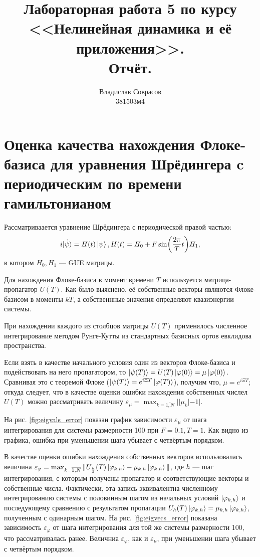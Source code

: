 \documentclass[a4paper]{article}
\begin{document}
\title{Лабораторная работа 5 по курсу <<Нелинейная динамика и её приложения>>. \\Отчёт.}
\author{Владислав Соврасов\\ 381503м4}
\date{}
\maketitle

\section{Оценка качества нахождения Флоке-базиса для уравнения Шрёдингера c
периодическим по времени гамильтонианом}
Рассматриваается уравнение Шрёдингера с периодической правой частью:
\begin{equation}
	\label{eq:schrodinger_eq}
	i \dot{\ket \psi} = H(t)\ket \psi, H(t)=H_0 + F \sin(\frac{2\pi}{T} t)H_1,
\end{equation}
в котором \(H_0, H_1\) --- GUE матрицы.

Для нахождения Флоке-базиса в момент времени \(T\) используется матрица-пропагатор \(U(T)\).
Как было выяснено, её собственные векторы являются Флоке-базисом в моменты \(kT\),
а собственнные значения определяют квазиэнергии системы.

При нахождении каждого из столбцов матрицы \(U(T)\) применялось численное интегрирование
методом Рунге-Кутты из стандартных базисных ортов евклидова пространства.

Если взять в качестве начального условия один из векторов Флоке-базиса и подействовать на
него пропагатором, то \(\ket{\psi(T)}=U(T)\ket{\varphi(0)}=\mu\ket{\varphi(0)}\). Сравнивая это с
теоремой Флоке (\(\ket{\psi(T)}=e^{i\Xi T}\ket{\varphi(T)}\)), получим что, \(\mu=e^{i\Xi T}\); откуда следует, что
в качестве оценки ошибки нахождения собственных числел \(U(T)\) можно рассматривать величину
\(\varepsilon_\mu = \max_{k=\overline{1,N}}||\mu_k|-1|\).

На рис. \ref{fig:eigvals_error} показан график зависимости \(\varepsilon_\mu\) от
шага интегрирования для системы размерности 100 при \(F=0.1,T=1\). Как видно из графика, ошибка при
уменьшении шага убывает с четвёртым порядком.

В качестве оценки ошибки нахождения собственных векторов использовалась величина
\(\varepsilon_\varphi=\max_{k=\overline{1,N}}\Vert U_{\frac{h}{2}}(T)\ket{\varphi_{k,h}} -\mu_{k,h}\ket{\varphi_{k,h}}\Vert\),
где \(h\) --- шаг интегрирования, с которым получены пропагатор и соответствующие векторы и собственные числа.
Фактически, эта запись эквивалентна численному интегрированию системы с половинным шагом
из начальных условий \(\ket{\varphi_{k,h}}\) и последующему сравнению с результатом
пропагации \(U_h(T)\ket{\varphi_{k,h}}=\mu_{k,h}\ket{\varphi_{k,h}}\), полученным с одинарным шагом. На рис. \ref{fig:eigvecs_error}
показана зависимость \(\varepsilon_\varphi\) от шага интегрирования для той же системы размерности
100, что рассматривалась ранее. Величниа \(\varepsilon_\varphi\), как и \(\varepsilon_\mu\),
при уменьшении шага убывает с четвёртым порядком.
\end{document}
